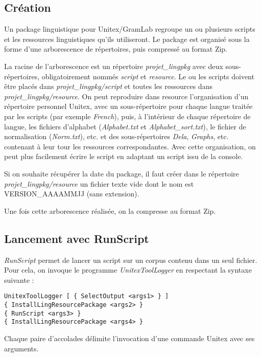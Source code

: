 \subsection{Création}
\label{section-creation}

Un package linguistique pour Unitex/GramLab regroupe un ou plusieurs scripts et les ressources linguistiques qu'ils utiliseront. Le package est organisé sous la forme d'une arborescence de répertoires, puis compressé au format Zip.

\bigskip
\noindent La racine de l'arborescence est un répertoire \emph{projet\_lingpkg} avec deux sous-répertoires, obligatoirement nommés \emph{script} et \emph{resource}. Le ou les scripts doivent être placés dans \emph{projet\_lingpkg/script} et toutes les ressources dans \emph{projet\_lingpkg/resource}. On peut reproduire dans resource l'organisation d'un répertoire personnel Unitex, avec un sous-répertoire pour chaque langue traitée par les scripts (par exemple \emph{French}), puis, à l'intérieur de chaque répertoire de langue, les fichiers d'alphabet (\emph{Alphabet.txt} et \emph{Alphabet\_sort.txt}), le fichier de normalisation (\emph{Norm.txt}), etc. et des sous-répertoires \emph{Dela}, \emph{Graphs}, etc. contenant à leur tour les ressources correspondantes. Avec cette organisation, on peut plus facilement écrire le script en adaptant un script issu de la console.

\bigskip
\noindent Si on souhaite récupérer la date du package, il faut créer dans le répertoire \emph{projet\_lingpkg/resource} un fichier texte vide dont le nom est VERSION\_AAAAMMJJ (sans extension).

\bigskip
\noindent Une fois cette arborescence réalisée, on la compresse au format Zip.

\subsection{Lancement avec RunScript}

\emph{RunScript} permet de lancer un script sur un corpus contenu dans un seul fichier. Pour cela, on invoque le programme \emph{UnitexToolLogger} en respectant la syntaxe suivante :

\begin{verbatim}
UnitexToolLogger [ { SelectOutput <args1> } ] 
{ InstallLingResourcePackage <args2> } 
{ RunScript <args3> } 
{ InstallLingResourcePackage <args4> }
\end{verbatim}

\bigskip
\noindent Chaque paire d'accolades délimite l'invocation d'une commande Unitex avec ses arguments.

